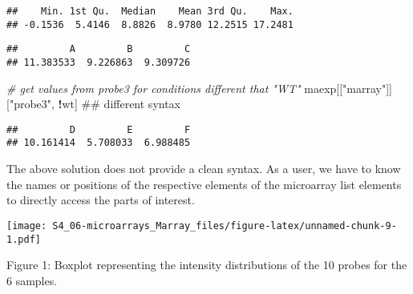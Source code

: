 \documentclass[]{article}
\newenvironment{Shaded}{\begin{snugshade}}{\end{snugshade}}
\newcommand{\CommentTok}[1]{\textcolor[rgb]{0.56,0.35,0.01}{\textit{#1}}}
\newcommand{\KeywordTok}[1]{\textcolor[rgb]{0.13,0.29,0.53}{\textbf{#1}}}
\newcommand{\NormalTok}[1]{#1}
\newcommand{\OperatorTok}[1]{\textcolor[rgb]{0.81,0.36,0.00}{\textbf{#1}}}
\newcommand{\StringTok}[1]{\textcolor[rgb]{0.31,0.60,0.02}{#1}}
\begin{document}
\begin{verbatim}
##    Min. 1st Qu.  Median    Mean 3rd Qu.    Max. 
## -0.1536  5.4146  8.8826  8.9780 12.2515 17.2481
\end{verbatim}

\begin{Shaded}
\end{Shaded}

\begin{verbatim}
##         A         B         C 
## 11.383533  9.226863  9.309726
\end{verbatim}

\begin{Shaded}
\begin{Highlighting}[]
\CommentTok{# get values from probe3 for conditions different that "WT"}
\NormalTok{ maexp[[}\StringTok{"marray"}\NormalTok{]][}\StringTok{"probe3"}\NormalTok{, }\OperatorTok{!}\NormalTok{wt] ## different syntax}
\end{Highlighting}
\end{Shaded}

\begin{verbatim}
##         D         E         F 
## 10.161414  5.708033  6.988485
\end{verbatim}

The above solution does not provide a clean syntax. As a user, we have
to know the names or positions of the respective elements of the
microarray list elements to directly access the parts of interest.

\begin{Shaded}
\end{Shaded}

\texttt{[image: S4\_06-microarrays\_Marray\_files/figure-latex/unnamed-chunk-9-1.pdf]}

Figure 1: Boxplot representing the intensity distributions of the 10
probes for the 6 samples.
\end{document}

